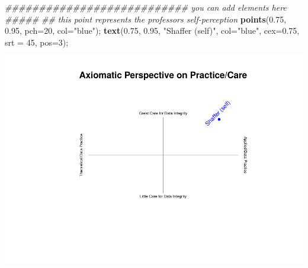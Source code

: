 \documentclass[
]{article}
\newenvironment{Shaded}{\begin{snugshade}}{\end{snugshade}}
\newcommand{\CommentTok}[1]{\textcolor[rgb]{0.56,0.35,0.01}{\textit{#1}}}
\newcommand{\DataTypeTok}[1]{\textcolor[rgb]{0.13,0.29,0.53}{#1}}
\newcommand{\DecValTok}[1]{\textcolor[rgb]{0.00,0.00,0.81}{#1}}
\newcommand{\FloatTok}[1]{\textcolor[rgb]{0.00,0.00,0.81}{#1}}
\newcommand{\KeywordTok}[1]{\textcolor[rgb]{0.13,0.29,0.53}{\textbf{#1}}}
\newcommand{\NormalTok}[1]{#1}
\newcommand{\StringTok}[1]{\textcolor[rgb]{0.31,0.60,0.02}{#1}}
\begin{document}
\begin{Shaded}
\begin{Highlighting}[]
\CommentTok{\#\#\#\#\#\#\#\#\#\#\#\#\#\#\#\#\#\#\#\#\#\#\#\#\#\#\# you can add elements here \#\#\#\#\#}
\CommentTok{\#\# this point represents the professor\textquotesingle{}s self{-}perception}
\KeywordTok{points}\NormalTok{(}\FloatTok{0.75}\NormalTok{, }\FloatTok{0.95}\NormalTok{, }\DataTypeTok{pch=}\DecValTok{20}\NormalTok{, }\DataTypeTok{col=}\StringTok{"blue"}\NormalTok{);}
\KeywordTok{text}\NormalTok{(}\FloatTok{0.75}\NormalTok{, }\FloatTok{0.95}\NormalTok{, }\StringTok{"Shaffer (self)"}\NormalTok{, }\DataTypeTok{col=}\StringTok{"blue"}\NormalTok{, }\DataTypeTok{cex=}\FloatTok{0.75}\NormalTok{, }\DataTypeTok{srt =} \DecValTok{45}\NormalTok{, }\DataTypeTok{pos=}\DecValTok{3}\NormalTok{);}
\end{Highlighting}
\end{Shaded}

\includegraphics{graphics/chunk-conclusion-analysis-data-1.pdf}
\end{document}

